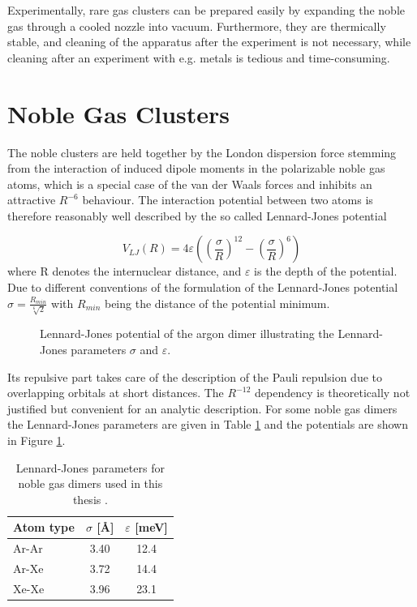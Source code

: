 Experimentally, rare gas clusters can be prepared easily by
expanding the noble gas through a cooled nozzle into vacuum. 
Furthermore, they are
thermically stable, and cleaning of the
apparatus after the experiment is not necessary, while cleaning
after an experiment with e.g. metals is tedious and time-consuming.


\section{Noble Gas Clusters}
The noble clusters are held together by the London dispersion force
stemming from the interaction of induced dipole moments in the polarizable
noble gas atoms, which is a special case of the van der Waals forces and
inhibits an attractive $R^{-6}$ behaviour.
The interaction potential between two atoms is therefore reasonably
well described by the so called
Lennard-Jones potential

\begin{equation}
  V_{LJ}(R) = 4 \varepsilon \left( \left(\frac{\sigma}{R}\right) ^{12}
              - \left(\frac{\sigma}{R}\right) ^{6} \right)
\end{equation}
where R denotes the internuclear distance, 
and $\varepsilon$ is the depth of the
potential. Due to different conventions of the formulation
of the Lennard-Jones potential $\sigma=\frac{R_{min}}{\sqrt[6]{2}}$
with $R_{min}$ being the distance of the potential minimum.

\begin{figure}[h]
 \centering
 
 \caption{Lennard-Jones potential of the argon dimer illustrating the
          Lennard-Jones parameters $\sigma$ and $\varepsilon$.}
 \label{figure:LJ_Ar2}
\end{figure}

Its repulsive part takes care of the description of the
Pauli repulsion due to overlapping orbitals at short distances. The
$R^{-12}$ dependency is theoretically not justified but convenient
for an analytic description.
For some noble gas dimers the Lennard-Jones parameters are given in
Table \ref{table:LJ_parameter} and the potentials are shown in
Figure \ref{figure:LJ_Ar2}.

\begin{table}[htb]
 \caption{Lennard-Jones parameters for noble gas dimers used in this
          thesis \cite{PhDFoerstel,Lindblad11}.}
 \centering
 \begin{tabular}{lcc}
   \toprule
   Atom type & $\sigma$ [\unit{\AA}] & $\varepsilon$ [\unit{meV}]\\
   \midrule
   Ar-Ar     &                 3.40  & 12.4\\
   Ar-Xe     &                 3.72  & 14.4\\
   Xe-Xe     &                 3.96  & 23.1\\
   \bottomrule
 \end{tabular}
 \label{table:LJ_parameter}
\end{table}


